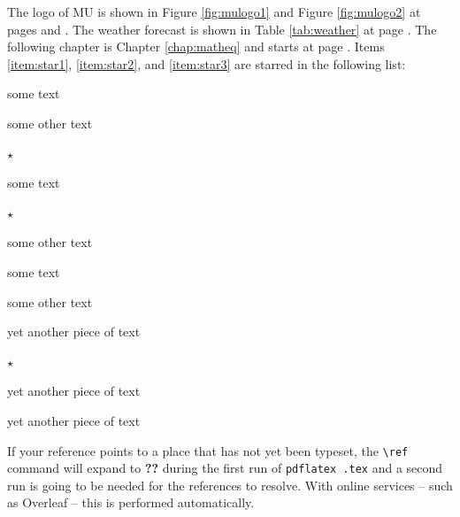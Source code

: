 \documentclass[
  digital,     %
  oneside,     %
  nosansbold,  %
  colorbold, %
  lof,         %
  lot,         %
]{fithesis4}
\begin{document}
The logo of \gls{MU} is shown in Figure \ref{fig:mulogo1} and
Figure \ref{fig:mulogo2} at pages \pageref{fig:mulogo1} and
\pageref{fig:mulogo2}. The weather forecast is shown in Table
\ref{tab:weather} at page \pageref{tab:weather}. The following
chapter is Chapter \ref{chap:matheq} and starts at page
\pageref{chap:matheq}.  Items \ref{item:star1}, \ref{item:star2},
and \ref{item:star3} are starred in the following list:
\begin{compactenum}
  \item some text
  \item some other text
  \item $\star$ \label{item:star1}
  \begin{compactenum}
    \item some text
    \item $\star$ \label{item:star2}
    \item some other text
    \begin{compactenum}
      \item some text
      \item some other text
      \item yet another piece of text
      \item $\star$ \label{item:star3}
    \end{compactenum}
    \item yet another piece of text
  \end{compactenum}
  \item yet another piece of text
\end{compactenum}
If your reference points to a place that has not yet been typeset,
the \verb"\ref" command will expand to \textbf{??} during the first
run of
\texttt{pdflatex \jobname.tex}
and a second run is going to be needed for the references to
resolve. With online services -- such as \Gls{Overleaf} -- this is
performed automatically.
\end{document}

